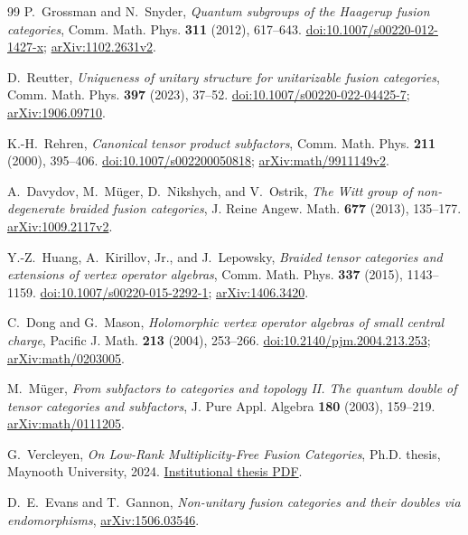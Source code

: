 \begin{thebibliography}{99}
P.~Grossman and N.~Snyder,
\emph{Quantum subgroups of the Haagerup fusion categories},
Comm. Math. Phys. \textbf{311} (2012), 617--643.
\href{https://doi.org/10.1007/s00220-012-1427-x}{doi:10.1007/s00220-012-1427-x};
\href{https://arxiv.org/abs/1102.2631v2}{arXiv:1102.2631v2}.

D.~Reutter,
\emph{Uniqueness of unitary structure for unitarizable fusion categories},
Comm. Math. Phys. \textbf{397} (2023), 37--52.
\href{https://doi.org/10.1007/s00220-022-04425-7}{doi:10.1007/s00220-022-04425-7};
\href{https://arxiv.org/abs/1906.09710}{arXiv:1906.09710}.

K.-H.~Rehren,
\emph{Canonical tensor product subfactors},
Comm. Math. Phys. \textbf{211} (2000), 395--406.
\href{https://doi.org/10.1007/s002200050818}{doi:10.1007/s002200050818};
\href{https://arxiv.org/abs/math/9911149v2}{arXiv:math/9911149v2}.

A.~Davydov, M.~M\"uger, D.~Nikshych, and V.~Ostrik,
\emph{The Witt group of non-degenerate braided fusion categories},
J. Reine Angew. Math. \textbf{677} (2013), 135--177.
\href{https://arxiv.org/abs/1009.2117v2}{arXiv:1009.2117v2}.

Y.-Z.~Huang, A.~Kirillov, Jr., and J.~Lepowsky,
\emph{Braided tensor categories and extensions of vertex operator algebras},
Comm. Math. Phys. \textbf{337} (2015), 1143--1159.
\href{https://doi.org/10.1007/s00220-015-2292-1}{doi:10.1007/s00220-015-2292-1};
\href{https://arxiv.org/abs/1406.3420}{arXiv:1406.3420}.

C.~Dong and G.~Mason,
\emph{Holomorphic vertex operator algebras of small central charge},
Pacific J. Math. \textbf{213} (2004), 253--266.
\href{https://doi.org/10.2140/pjm.2004.213.253}{doi:10.2140/pjm.2004.213.253};
\href{https://arxiv.org/abs/math/0203005}{arXiv:math/0203005}.

M.~M\"uger,
\emph{From subfactors to categories and topology II.
The quantum double of tensor categories and subfactors},
J. Pure Appl. Algebra \textbf{180} (2003), 159--219.
\href{https://arxiv.org/abs/math/0111205}{arXiv:math/0111205}.

G.~Vercleyen,
\emph{On Low-Rank Multiplicity-Free Fusion Categories},
Ph.D. thesis, Maynooth University, 2024.
\href{https://mural.maynoothuniversity.ie/id/eprint/18958/1/phd.pdf}{Institutional thesis PDF}.

D.~E.~Evans and T.~Gannon,
\emph{Non-unitary fusion categories and their doubles via endomorphisms},
\href{https://arxiv.org/abs/1506.03546}{arXiv:1506.03546}.


\end{thebibliography}
